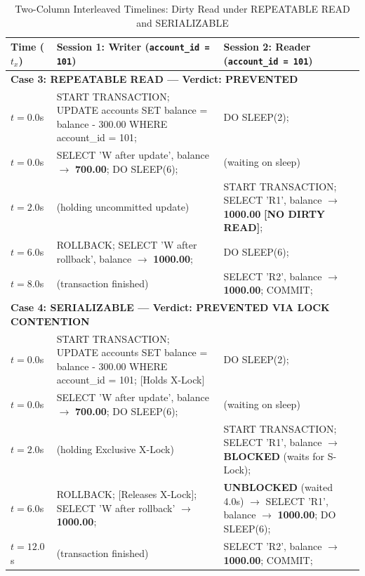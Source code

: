 \documentclass[sigconf, pbalance, nonacm]{acmart}
\begin{document}
\begin{table}[t]
\centering
\small
\caption{Two-Column Interleaved Timelines: Dirty Read under REPEATABLE READ and SERIALIZABLE}
\label{tab:dirty_rr_ser}
\begin{tabularx}{\textwidth}{p{1.8cm} X X}
\toprule
\textbf{Time ($t_x$)} & \textbf{Session 1: Writer (\texttt{account\_id = 101})} & \textbf{Session 2: Reader (\texttt{account\_id = 101})} \\
\midrule
\multicolumn{3}{l}{\textbf{Case 3: REPEATABLE READ --- Verdict: PREVENTED}} \\
$t = 0.0$s & START TRANSACTION; UPDATE accounts SET balance = balance - 300.00 WHERE account\_id = 101; & DO SLEEP(2); \\
$t = 0.0$s & SELECT 'W after update', balance $\rightarrow$ \textbf{700.00}; DO SLEEP(6); & (waiting on sleep) \\
$t = 2.0$s & (holding uncommitted update) & START TRANSACTION; SELECT 'R1', balance $\rightarrow$ \textbf{1000.00} \textbf{[NO DIRTY READ]}; \\
$t = 6.0$s & ROLLBACK; SELECT 'W after rollback', balance $\rightarrow$ \textbf{1000.00}; & DO SLEEP(6); \\
$t = 8.0$s & (transaction finished) & SELECT 'R2', balance $\rightarrow$ \textbf{1000.00}; COMMIT; \\
\midrule
\multicolumn{3}{l}{\textbf{Case 4: SERIALIZABLE --- Verdict: PREVENTED VIA LOCK CONTENTION}} \\
$t = 0.0$s & START TRANSACTION; UPDATE accounts SET balance = balance - 300.00 WHERE account\_id = 101; [Holds X-Lock] & DO SLEEP(2); \\
$t = 0.0$s & SELECT 'W after update', balance $\rightarrow$ \textbf{700.00}; DO SLEEP(6); & (waiting on sleep) \\
$t = 2.0$s & (holding Exclusive X-Lock) & START TRANSACTION; SELECT 'R1', balance $\rightarrow$ \textbf{BLOCKED} (waits for S-Lock); \\
$t = 6.0$s & ROLLBACK; [Releases X-Lock]; SELECT 'W after rollback' $\rightarrow$ \textbf{1000.00}; & \textbf{UNBLOCKED} (waited 4.0s) $\rightarrow$ SELECT 'R1', balance $\rightarrow$ \textbf{1000.00}; DO SLEEP(6); \\
$t = 12.0$s & (transaction finished) & SELECT 'R2', balance $\rightarrow$ \textbf{1000.00}; COMMIT; \\
\bottomrule
\end{tabularx}
\end{table}
\end{document}
